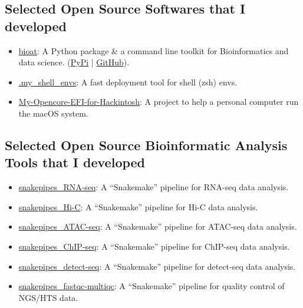 \subsection*{\textbf{Selected Open Source Softwares that I developed}}
\begin{itemize}
    \item \href{https://github.com/hermanzhaozzzz/bioat}{bioat}: A Python package \& a command line toolkit for Bioinformatics and data science. (\href{https://pypi.org/project/bioat/}{PyPi} | \href{https://github.com/hermanzhaozzzz/bioat}{GitHub}).
    \item \href{https://github.com/hermanzhaozzzz/.my_shell_envs}{.my\_shell\_envs}: A fast deployment tool for shell (zsh) envs.
    \item \href{https://github.com/hermanzhaozzzz/My-Opencore-EFI-for-AMD3900X-5700XT-TUF-x570-Hackintosh}{My-Opencore-EFI-for-Hackintosh}: A project to help a personal computer run the macOS system.
\end{itemize}

\subsection*{\textbf{Selected Open Source Bioinformatic Analysis Tools that I developed}}
\begin{itemize}
    \item \href{https://github.com/hermanzhaozzzz/snakepipes_RNA-seq}{snakepipes\_RNA-seq}: A ``Snakemake'' pipeline for RNA-seq data analysis.
    \item \href{https://github.com/hermanzhaozzzz/snakepipes_Hi-C}{snakepipes\_Hi-C}: A ``Snakemake'' pipeline for Hi-C data analysis.
    \item \href{https://github.com/hermanzhaozzzz/snakepipes_ATAC-seq}{snakepipes\_ATAC-seq}: A ``Snakemake'' pipeline for ATAC-seq data analysis.
    \item \href{https://github.com/hermanzhaozzzz/snakepipes_ChIP-seq}{snakepipes\_ChIP-seq}: A ``Snakemake'' pipeline for ChIP-seq data analysis.
    \item \href{https://github.com/hermanzhaozzzz/snakepipes_detect-seq}{snakepipes\_detect-seq}: A ``Snakemake'' pipeline for detect-seq data analysis.
    \item \href{https://github.com/hermanzhaozzzz/snakepipes_fastqc-multiqc}{snakepipes\_fastqc-multiqc}: A ``Snakemake'' pipeline for quality control of NGS/HTS data.
\end{itemize}

